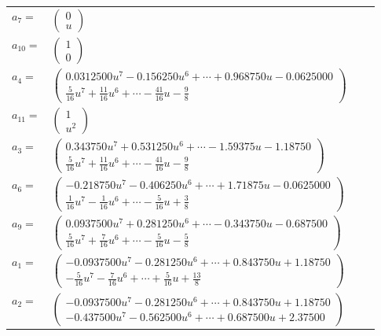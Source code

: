 \documentclass[1p]{elsarticle_modified}
\theoremstyle{definition}
\begin{document}
\begin{tabular}{m{7pt} m{180pt} m{7pt} m{180pt} }
\flushright $a_{7}=$&$\begin{pmatrix}0\\u\end{pmatrix}$ \\
\flushright $a_{10}=$&$\begin{pmatrix}1\\0\end{pmatrix}$ \\
\flushright $a_{4}=$&$\begin{pmatrix}0.0312500 u^{7}-0.156250 u^{6}+\cdots+0.968750 u-0.0625000\\\frac{5}{16} u^7+\frac{11}{16} u^6+\cdots-\frac{41}{16} u-\frac{9}{8}\end{pmatrix}$ \\
\flushright $a_{11}=$&$\begin{pmatrix}1\\u^2\end{pmatrix}$ \\
\flushright $a_{3}=$&$\begin{pmatrix}0.343750 u^{7}+0.531250 u^{6}+\cdots-1.59375 u-1.18750\\\frac{5}{16} u^7+\frac{11}{16} u^6+\cdots-\frac{41}{16} u-\frac{9}{8}\end{pmatrix}$ \\
\flushright $a_{6}=$&$\begin{pmatrix}-0.218750 u^{7}-0.406250 u^{6}+\cdots+1.71875 u-0.0625000\\\frac{1}{16} u^7-\frac{1}{16} u^6+\cdots-\frac{5}{16} u+\frac{3}{8}\end{pmatrix}$ \\
\flushright $a_{9}=$&$\begin{pmatrix}0.0937500 u^{7}+0.281250 u^{6}+\cdots-0.343750 u-0.687500\\\frac{5}{16} u^7+\frac{7}{16} u^6+\cdots-\frac{5}{16} u-\frac{5}{8}\end{pmatrix}$ \\
\flushright $a_{1}=$&$\begin{pmatrix}-0.0937500 u^{7}-0.281250 u^{6}+\cdots+0.843750 u+1.18750\\-\frac{5}{16} u^7-\frac{7}{16} u^6+\cdots+\frac{5}{16} u+\frac{13}{8}\end{pmatrix}$ \\
\flushright $a_{2}=$&$\begin{pmatrix}-0.0937500 u^{7}-0.281250 u^{6}+\cdots+0.843750 u+1.18750\\-0.437500 u^{7}-0.562500 u^{6}+\cdots+0.687500 u+2.37500\end{pmatrix}$ \\

\end{tabular}
\end{document}
